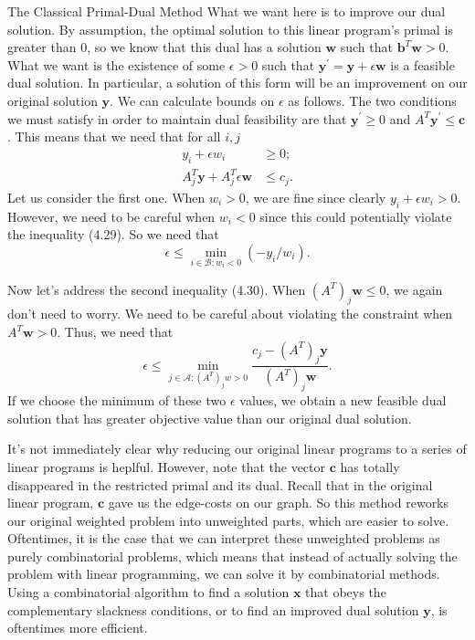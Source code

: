 \begin{section}{The Classical Primal-Dual Method}
	What we want here is to improve our dual solution. By assumption, the optimal solution to this 
	linear program's primal is greater than 0, so we know that this dual has a solution 
	$\mathbf{w}$ such that $\mathbf{b}^{T}\mathbf{w} > 0$. What we want is the existence of 
	some $\epsilon > 0$ such that $\mathbf{y}^{'} = \mathbf{y} + \epsilon \mathbf{w}$ is a 
	feasible dual solution. In particular, a solution of this form will be an improvement on our 
	original solution $\mathbf{y}$. We can calculate bounds on $\epsilon$ as follows. The two 
	conditions we must satisfy in order to maintain dual feasibility are that 
	$\mathbf{y}^{'} \geq 0$ and $A^{T}\mathbf{y}^{'} \leq \mathbf{c}$. This means that we need that
	for all $i,j$
	\begin{align}
		y_i + \epsilon w_i &\geq 0; \\
		A^{T}_j \mathbf{y} + A^T_j \epsilon \mathbf{w} & \leq c_j.
	\end{align}
	Let us consider the first one. When $w_i > 0$, we are fine since clearly 
	$y_i +\epsilon w_i > 0$. However, we need to be careful when 
	$w_i < 0$ since this could potentially violate the inequality (4.29). So we need that
	\[
		\epsilon \leq \min_{i\in \mathcal{B}: w_i < 0} (-y_i/w_i).
	\]

	Now let's address the second inequality (4.30). When $(A^{T})_j\mathbf{w} \leq 0$, we again 
	don't need to worry. We 
	need to be careful about violating the constraint when $A^{T}\mathbf{w} > 0$. Thus, we need that
	\[
		\epsilon \leq \min_{j\in \mathcal{A}: (A^{T})_jw > 0} \frac{c_j-(A^{T})_j\mathbf{y}}
		{(A^{T})_j \mathbf{w}}.
	\]
	If we choose the minimum of these two $\epsilon$ values, we obtain a new feasible dual solution 
	that has greater objective value than our original dual solution. 

	It's not immediately clear why reducing our original linear programs to a series of linear 
	programs is heplful. However,  note that the vector $\mathbf{c}$ has totally disappeared in 
	the restricted primal and its dual. Recall that in the original linear program, $\mathbf{c}$ 
	gave us the edge-costs on our graph. So this method reworks our original weighted problem 
	into unweighted parts, which are easier to solve. Oftentimes, it is the case that 
	we can interpret these unweighted problems as purely combinatorial problems, which means that 
	instead of actually solving the problem with linear programming, we can solve it by 
	combinatorial methods. 
	Using a combinatorial algorithm to find a solution $\mathbf{x}$ that obeys the 
	complementary slackness conditions, or to find an improved dual solution $\mathbf{y}$, is 
	oftentimes more efficient.
\end{section}
	
